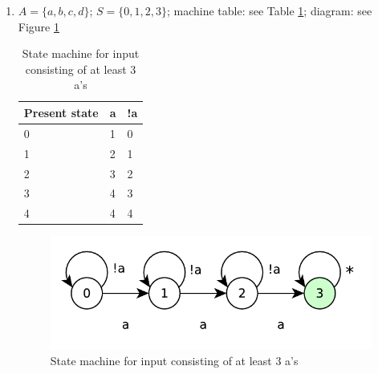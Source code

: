 \documentclass{article}
\begin{document}
\begin{enumerate}
    \item $A = \{a, b, c, d\}$; $S = \{0, 1, 2, 3\}$; machine table: see Table \ref{tab:machine-at-least-3as}; diagram: see Figure \ref{fig:atleast3as}
    \begin{table}[!ht]
        \centering
        \begin{tabular}{l|ll}
        Present state & a & !a \\ \hline
        0             & 1 & 0  \\
        1             & 2 & 1  \\
        2             & 3 & 2  \\
        3             & 4 & 3  \\
        4             & 4 & 4 
        \end{tabular}
        \caption{State machine for input consisting of at least 3 a's}
        \label{tab:machine-at-least-3as}
    \end{table}
    \begin{figure}[!ht]
        \centering
        \includegraphics[scale=0.5]{diagrams/atleast3as.pdf}
        \caption{State machine for input consisting of at least 3 a's}
        \label{fig:atleast3as}
    \end{figure}


\end{enumerate}
\end{document}
